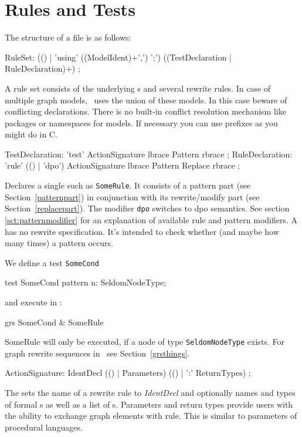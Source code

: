 \section{Rules and Tests}
\label{ruledecls}
The structure of a  file is as follows:
\begin{rail}
  RuleSet: (() | 'using' ((ModelIdent)+',') ';') ((TestDeclaration | RuleDeclaration)+) ;
\end{rail}
A rule set consists of the underlying s and several rewrite rules. In case of multiple graph models, \GrG\ uses the union of these models. In this case beware of conflicting declarations. There is no built-in conflict resolution mechanism like packages or namespaces for models. If necessary you can use prefixes as you might do in C.

\begin{rail}
  TestDeclaration: 'test' ActionSignature lbrace Pattern rbrace ;
  RuleDeclaration: 'rule' (() | 'dpo') ActionSignature lbrace Pattern Replace rbrace ;
\end{rail}
Declares a single  such as \texttt{SomeRule}. It consists of a pattern part (see Section~\ref{patternpart}) in conjunction with its rewrite/modify part (see Section~\ref{replacepart}). The modifier \texttt{dpo} switches to dpo semantics. See section \ref{sct:patternmodifier} for an explanation of available rule and pattern modifiers. A  has no rewrite specification. It's intended to check whether (and maybe how many times) a pattern occurs.
\begin{example}
We define a test \texttt{SomeCond}
\begin{grgen}
test SomeCond {
  pattern {
    n: SeldomNodeType;
  }
}
\end{grgen}
and execute in \GrShell:
\begin{grshell}
  grs SomeCond & SomeRule
\end{grshell}
SomeRule will only be executed, if a node of type \texttt{SeldomNodeType} exists. For graph rewrite sequences in \GrShell\ see Section~\ref{grsthings}.
\end{example}

\begin{rail}  
  ActionSignature: IdentDecl (() | Parameters) (() | ':' ReturnTypes) ;
\end{rail}
The  sets the name of a rewrite rule to \emph{IdentDecl} and optionally names and types of formal s as well as a list of s. Parameters and return types provide users with the ability to exchange graph elements with rule. This is similar to parameters of procedural languages.

